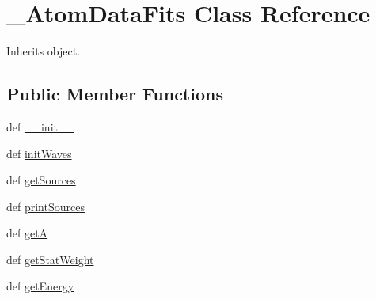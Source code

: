 \hypertarget{classpyneb_1_1core_1_1pynebcore_1_1___atom_data_fits}{\section{\-\_\-\-Atom\-Data\-Fits Class Reference}
\label{classpyneb_1_1core_1_1pynebcore_1_1___atom_data_fits}
}


Inherits object.

\subsection*{Public Member Functions}
\begin{DoxyCompactItemize}
\item 
def \hyperlink{classpyneb_1_1core_1_1pynebcore_1_1___atom_data_fits_ac775ee34451fdfa742b318538164070e}{\-\_\-\-\_\-init\-\_\-\-\_\-}
\item 
def \hyperlink{classpyneb_1_1core_1_1pynebcore_1_1___atom_data_fits_a585a5ccbf1996b61e811632daf83d9a5}{init\-Waves}
\item 
def \hyperlink{classpyneb_1_1core_1_1pynebcore_1_1___atom_data_fits_a13685d48c0180c5463a5dffebcd4fb29}{get\-Sources}
\item 
def \hyperlink{classpyneb_1_1core_1_1pynebcore_1_1___atom_data_fits_a0120b7dbd5f911f8b1df2d2cebf6c09c}{print\-Sources}
\item 
def \hyperlink{classpyneb_1_1core_1_1pynebcore_1_1___atom_data_fits_a17192519660871ef6a77e6bdad6f580d}{get\-A}
\item 
def \hyperlink{classpyneb_1_1core_1_1pynebcore_1_1___atom_data_fits_a00fb8d8bc6381e46ebb1b76b2770442a}{get\-Stat\-Weight}
\item 
def \hyperlink{classpyneb_1_1core_1_1pynebcore_1_1___atom_data_fits_a8406acc27904d955ee4dbb458f60db52}{get\-Energy}
\end{DoxyCompactItemize}
